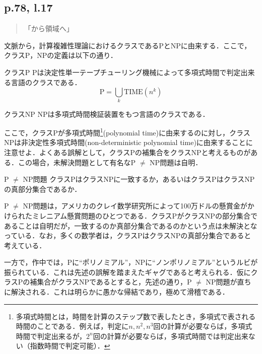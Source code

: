 \documentclass[10pt, a5paper, twoside]{ltjsarticle}
\begin{document}
        \subsection{p.78, l.17}

            \begin{quote}
                「から領域へ」
            \end{quote}

            文脈から，計算複雑性理論におけるクラスであるPとNPに由来する．ここで，クラスP，NPの定義は以下の通り\cite{sip3}．

            \begin{dfn}{クラスP}{}
				Pは決定性単一テープチューリング機械によって多項式時間で判定出来る言語のクラスである．
				$$\mathrm{P} = \bigcup_{k} \mathrm{TIME}(n^k)$$
			\end{dfn}

            \begin{dfn}{クラスNP}{}
                NPは多項式時間検証装置をもつ言語のクラスである．
            \end{dfn}

            ここで，クラスPが多項式時間\footnote{多項式時間とは，時間を計算のステップ数で表したとき，多項式で表される時間のことである．例えば，判定に$n, n^2, n^3$回の計算が必要ならば，多項式時間で判定出来るが，$2^n$回の計算が必要ならば，多項式時間では判定出来ない（指数時間で判定可能）．}(polynomial time)に由来するのに対し，クラスNPは非決定性多項式時間(non-deterministic polynomial time)に由来することに注意せよ．よくある誤解として，クラスPの補集合をクラスNPと考えるものがある．この場合，未解決問題として有名なP $\neq$ NP問題は自明．

            \begin{prb}{P $\neq$ NP問題}{}
                クラスPはクラスNPに一致するか，あるいはクラスPはクラスNPの真部分集合であるか．
            \end{prb}

            P $\neq$ NP問題は，アメリカのクレイ数学研究所によって100万ドルの懸賞金がかけられたミレニアム懸賞問題のひとつである．クラスPがクラスNPの部分集合であることは自明だが，一致するのか真部分集合であるのかという点は未解決となっている．なお，多くの数学者は，クラスPはクラスNPの真部分集合であると考えている．

            一方で，作中では，Pに“ポリノミアル”，NPに“ノンポリノミアル”というルビが振られている．これは先述の誤解を踏まえたギャグであると考えられる．仮にクラスPの補集合がクラスNPであるとすると，先述の通り，P $\neq$ NP問題が直ちに解決される．これは明らかに愚かな帰結であり，極めて滑稽である．
\end{document}
